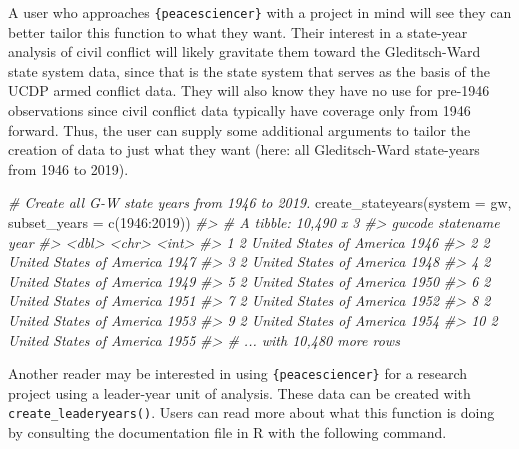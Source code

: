 \documentclass[
  11pt,
]{article}
\newenvironment{Shaded}{\begin{snugshade}}{\end{snugshade}}
\newcommand{\AttributeTok}[1]{\textcolor[rgb]{0.77,0.63,0.00}{#1}}
\newcommand{\CommentTok}[1]{\textcolor[rgb]{0.56,0.35,0.01}{\textit{#1}}}
\newcommand{\DecValTok}[1]{\textcolor[rgb]{0.00,0.00,0.81}{#1}}
\newcommand{\FunctionTok}[1]{\textcolor[rgb]{0.00,0.00,0.00}{#1}}
\newcommand{\NormalTok}[1]{#1}
\newcommand{\SpecialCharTok}[1]{\textcolor[rgb]{0.00,0.00,0.00}{#1}}
\newcommand{\StringTok}[1]{\textcolor[rgb]{0.31,0.60,0.02}{#1}}
\begin{document}
A user who approaches \texttt{\{peacesciencer\}} with a project in mind will see they can better tailor this function to what they want. Their interest in a state-year analysis of civil conflict will likely gravitate them toward the Gleditsch-Ward state system data, since that is the state system that serves as the basis of the UCDP armed conflict data. They will also know they have no use for pre-1946 observations since civil conflict data typically have coverage only from 1946 forward. Thus, the user can supply some additional arguments to tailor the creation of data to just what they want (here: all Gleditsch-Ward state-years from 1946 to 2019).

\begin{Shaded}
\begin{Highlighting}[]
\CommentTok{\# Create all G{-}W state years from 1946 to 2019.}
\FunctionTok{create\_stateyears}\NormalTok{(}\AttributeTok{system =} \StringTok{\textquotesingle{}gw\textquotesingle{}}\NormalTok{, }\AttributeTok{subset\_years =} \FunctionTok{c}\NormalTok{(}\DecValTok{1946}\SpecialCharTok{:}\DecValTok{2019}\NormalTok{))}
\CommentTok{\#\textgreater{} \# A tibble: 10,490 x 3}
\CommentTok{\#\textgreater{}    gwcode statename                 year}
\CommentTok{\#\textgreater{}     \textless{}dbl\textgreater{} \textless{}chr\textgreater{}                    \textless{}int\textgreater{}}
\CommentTok{\#\textgreater{}  1      2 United States of America  1946}
\CommentTok{\#\textgreater{}  2      2 United States of America  1947}
\CommentTok{\#\textgreater{}  3      2 United States of America  1948}
\CommentTok{\#\textgreater{}  4      2 United States of America  1949}
\CommentTok{\#\textgreater{}  5      2 United States of America  1950}
\CommentTok{\#\textgreater{}  6      2 United States of America  1951}
\CommentTok{\#\textgreater{}  7      2 United States of America  1952}
\CommentTok{\#\textgreater{}  8      2 United States of America  1953}
\CommentTok{\#\textgreater{}  9      2 United States of America  1954}
\CommentTok{\#\textgreater{} 10      2 United States of America  1955}
\CommentTok{\#\textgreater{} \# ... with 10,480 more rows}
\end{Highlighting}
\end{Shaded}

Another reader may be interested in using \texttt{\{peacesciencer\}} for a research project using a leader-year unit of analysis. These data can be created with \texttt{create\_leaderyears()}. Users can read more about what this function is doing by consulting the documentation file in R with the following command.
\end{document}
